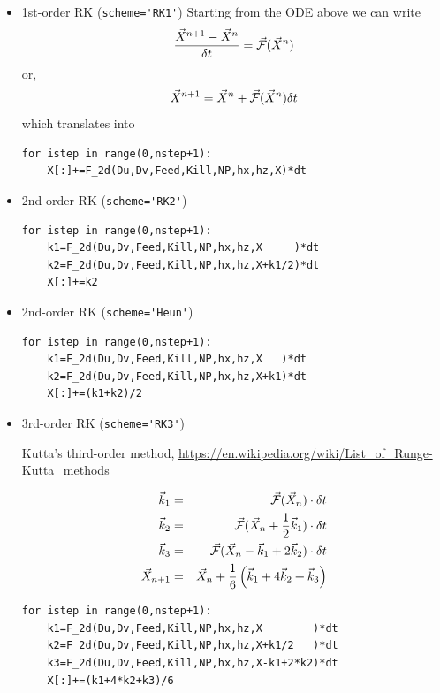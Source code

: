 \begin{itemize}

\item 1st-order RK (\lstinline{scheme='RK1'})
Starting from the ODE above we can write
\[
\frac{\vec{X}^{n+1} -\vec{X}^{n} }{\delta t} = \vec{\cal F} (\vec{X}^n)
\]
or, 
\[
\vec{X}^{n+1}
=
\vec{X}^{n} + \vec{\cal F} (\vec{X}^n) \delta t
\]
which translates into
\begin{lstlisting}
for istep in range(0,nstep+1):
    X[:]+=F_2d(Du,Dv,Feed,Kill,NP,hx,hz,X)*dt
\end{lstlisting}

\item 2nd-order RK (\lstinline{scheme='RK2'})
\begin{lstlisting}
for istep in range(0,nstep+1):
    k1=F_2d(Du,Dv,Feed,Kill,NP,hx,hz,X     )*dt
    k2=F_2d(Du,Dv,Feed,Kill,NP,hx,hz,X+k1/2)*dt
    X[:]+=k2
\end{lstlisting}

\item 2nd-order RK (\lstinline{scheme='Heun'})

\begin{lstlisting}
for istep in range(0,nstep+1):
    k1=F_2d(Du,Dv,Feed,Kill,NP,hx,hz,X   )*dt
    k2=F_2d(Du,Dv,Feed,Kill,NP,hx,hz,X+k1)*dt
    X[:]+=(k1+k2)/2
\end{lstlisting}

\item 3rd-order RK (\lstinline{scheme='RK3'})

Kutta's third-order method, \url{https://en.wikipedia.org/wiki/List_of_Runge-Kutta_methods}

\begin{eqnarray}
\vec{k}_1 &=& \vec{\cal F}(\vec{X}_n) \cdot \delta t\nonumber\\
\vec{k}_2 &=& \vec{\cal F}(\vec{X}_n+ \frac{1}{2} \vec{k}_1) \cdot \delta t \nonumber\\
\vec{k}_3 &=& \vec{\cal F}(\vec{X}_n -\vec{k}_1 +2\vec{k}_2) \cdot \delta t \nonumber\\
\vec{X}_{n+1} &=& \vec{X}_n + \frac{1}{6}\left(\vec{k}_1 + 4\vec{k}_2 + \vec{k}_3 \right)
\end{eqnarray}

\begin{lstlisting}
for istep in range(0,nstep+1):
    k1=F_2d(Du,Dv,Feed,Kill,NP,hx,hz,X        )*dt
    k2=F_2d(Du,Dv,Feed,Kill,NP,hx,hz,X+k1/2   )*dt
    k3=F_2d(Du,Dv,Feed,Kill,NP,hx,hz,X-k1+2*k2)*dt
    X[:]+=(k1+4*k2+k3)/6
\end{lstlisting}



\end{itemize}
